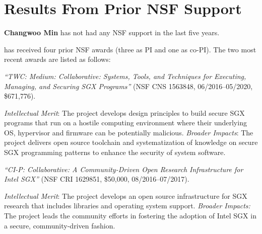 \section{Results From Prior NSF Support}
\label{sec:prior}

{\bf Changwoo Min} has not had any NSF support in the last five years.

\vspace{5px}
has received four prior NSF awards (three as PI and one as
co-PI). The two most recent awards are listed as follows:
\vspace{5px}

\noindent\emph{``TWC: Medium: Collaborative: Systems, Tools, and
  Techniques for Executing, Managing, and Securing SGX Programs''}
(NSF CNS 1563848, 06/2016--05/2020, \$671,776).

\textit{Intellectual Merit}: The project develops
design principles to build secure SGX programs
that run on a hostile computing environment
where their underlying OS, hypervisor and firmware
can be potentially malicious.
%
\textit{Broader Impacts}: The project delivers
open source toolchain and systematization of knowledge
on secure SGX programming patterns
to enhance the security of system software.

\vspace{5px}
\noindent \emph{``CI-P: Collaborative: A Community-Driven Open
  Research Infrastructure for Intel SGX''}
(NSF CRI 1629851, \$50,000, 08/2016--07/2017).

\textit{Intellectual Merit}: The project 
develops an open source infrastructure for SGX research
that includes libraries and operating system support.
%
\textit{Broader Impacts:}
The project
leads the community efforts in fostering the adoption
of Intel SGX in a secure, community-driven fashion.



